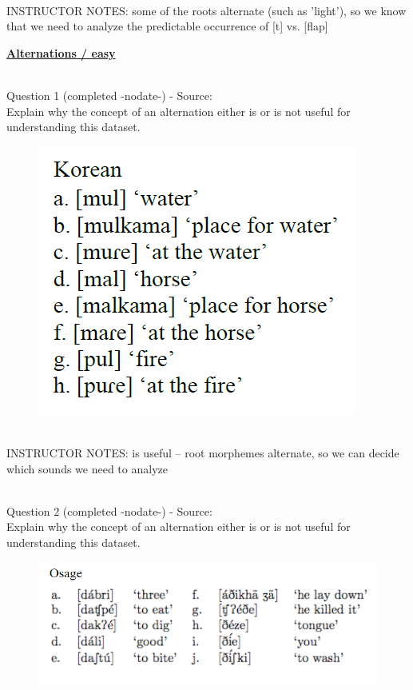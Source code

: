 \documentclass[12pt]{article}
\begin{document}
~\\
INSTRUCTOR NOTES: some of the roots alternate (such as 'light'), so we know that we need to analyze the predictable occurrence of [t] vs. [flap]


\newpage\textbf{\underline{\huge Alternations / easy\\}}

~\\

{\large Question 1} (completed -nodate-) - Source: \\

Explain why the concept of an alternation either is or is not useful for understanding this dataset.\\

\begin{figure}[H]
\includegraphics{../images/korean.png}
\end{figure}

~\\
INSTRUCTOR NOTES: is useful -- root morphemes alternate, so we can decide which sounds we need to analyze


~\\

{\large Question 2} (completed -nodate-) - Source: \\

Explain why the concept of an alternation either is or is not useful for understanding this dataset.\\

\begin{figure}[H]
\includegraphics{../images/osage.png}
\end{figure}
\end{document}
